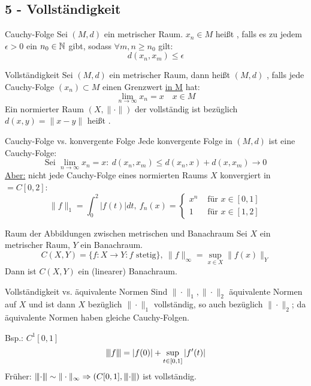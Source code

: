 \subsection*{5 - Vollst{\"a}ndigkeit}

	\begin{karte}{Cauchy-Folge}
		Sei $(M, d)$ ein metrischer Raum. $x_{n} \in M$ hei{\ss}t , falls es zu jedem $\epsilon > 0$ ein $n_{0} \in \mathbb{N}$ gibt, sodass $\forall m, n \geq n_{0}$ gilt:
			\[ d(x_{n}, x_{m}) \leq \epsilon \]	
	\end{karte}
	
	\begin{karte}{Vollständigkeit}
		Sei $(M, d)$ ein metrischer Raum, dann hei{\ss}t $(M, d)$ , falls jede Cauchy-Folge $(x_{n}) \subset M$ einen Grenzwert \uline{in M} hat:
			\[ \lim_{n \rightarrow \infty} x_{n} = x \quad x \in M \]
		Ein normierter Raum $(X, \| \cdot \|)$ der vollständig ist bezüglich $d(x, y) = \| x - y \|$ heißt .
	\end{karte}
	
	\begin{karte}{Cauchy-Folge vs. konvergente Folge}
		Jede konvergente Folge in $(M, d)$ ist eine Cauchy-Folge:
			\[ \text{Sei } \lim_{n \rightarrow \infty} x_{n} = x: ~ d(x_{n}, x_{m}) \leq d(x_{n}, x) + d(x, x_{m}) \rightarrow 0 \]
		 	\uline{Aber:} nicht jede Cauchy-Folge eines normierten Raums $X$ konvergiert in $ = C[0, 2]$:
			\[ \| f \|_{1} = \int_{0}^{2} | f(t) | dt, ~ f_{n}(x) = \begin{cases}x^{n} & \text{ für } x \in [0, 1] \\ 1 & \text{ für } x \in [1, 2]\end{cases} \]
	\end{karte}

	\begin{karte}{Raum der Abbildungen zwischen metrischen und Banachraum}	
		Sei $X$ ein metrischer Raum, $Y$ ein Banachraum.
		\[ C(X, Y) = \{ f \colon X \rightarrow Y: f \text{ stetig} \}, ~ \| f \|_{\infty} = \sup_{x \in X} \| f(x) \|_{Y} \]
		Dann ist $C(X, Y)$ ein (linearer) Banachraum.
	\end{karte}
	
	\begin{karte}{Vollständigkeit vs. äquivalente Normen}		
		Sind $\| \cdot \|_{1}, \| \cdot \|_{2}$ äquivalente Normen auf $X$ und ist dann $X$ bezüglich $\| \cdot \|_{1}$ vollständig, so auch bezüglich $\| \cdot \|_{2}$; da äquivalente Normen haben gleiche Cauchy-Folgen.
	
		Bsp.: $C^{1}[0, 1]$
		\[ {\left\vert\kern-0.25ex\left\vert\kern-0.25ex\left\vert f\right\vert\kern-0.25ex\right\vert\kern-0.25ex\right\vert} = |f(0)| + \sup_{t \in [0, 1]} | f'(t) | \]
		Früher: ${\left\vert\kern-0.25ex\left\vert\kern-0.25ex\left\vert\cdot\right\vert\kern-0.25ex\right\vert\kern-0.25ex\right\vert} \sim \| \cdot \|_{\infty} \Rightarrow \left( C[0, 1], {\left\vert\kern-0.25ex\left\vert\kern-0.25ex\left\vert\cdot\right\vert\kern-0.25ex\right\vert\kern-0.25ex\right\vert} \right)$ ist vollständig.
	\end{karte}

